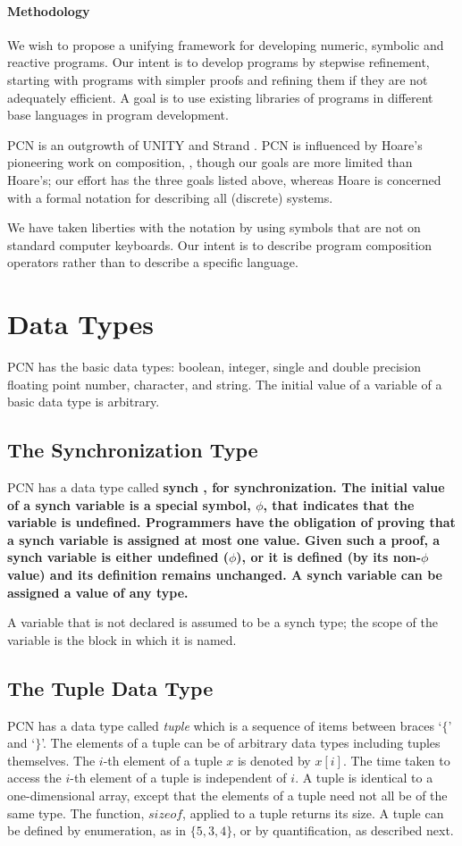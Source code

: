 \paragraph{Methodology}
We wish to propose a unifying framework for developing numeric, symbolic and 
reactive programs. 
Our intent is to develop programs by stepwise refinement, starting with 
programs with simpler proofs and refining them if they are not
adequately efficient.
A goal is to use existing libraries of programs in different base languages
in program development.



PCN is an outgrowth of UNITY \cite{book} and Strand \cite{Steve}.
PCN is influenced by Hoare's pioneering work on composition, \cite{Hoare},
though our goals are more limited than Hoare's; our effort has the 
three goals listed above, whereas Hoare is concerned with a formal 
notation for describing all (discrete) systems.

We have taken liberties with the notation by using symbols that are
not on standard computer keyboards. 
Our intent is to describe program composition operators rather than
to describe a specific language.

\section{Data Types}
PCN has the basic data types: boolean, integer,
single and double precision floating point number, character, and string.
The initial value of a variable of a basic data type is arbitrary.


\subsection{The Synchronization Type}
PCN has a data type called \bf synch \rm, for synchronization.
The initial value of a synch variable is a special symbol, $\phi$,
that indicates that the variable is undefined.
Programmers have the obligation of proving that a synch variable is
assigned at most one value. Given such a proof,
a synch variable is either undefined ($\phi$), or it is defined
(by its non-$\phi$ value) and its definition remains unchanged.
A synch variable can be assigned a value of any type.

A variable that is not declared is assumed to be a synch type; the
scope of the variable is the block in which it is named.

\subsection{The Tuple Data Type}
PCN has a data type called {\em tuple} which
is a sequence of items between braces `$\{$' and 
`$\}$'.
The elements of a tuple can be of arbitrary data types including 
tuples themselves.
The $i$-th element of a tuple $x$ is denoted by $x[i]$.
The time taken to access the $i$-th element of a tuple is
independent of $i$.
A tuple is identical to a one-dimensional array, except that
the elements of a tuple need not all be of the same type.
The function, $sizeof$, applied to a tuple returns its size.
A tuple can be defined by enumeration, as in $\{5,3,4\}$, or by quantification,
as described next.


